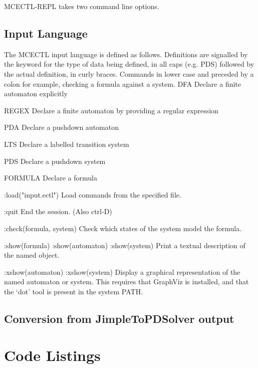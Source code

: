 \documentclass[11pt]{article}
\theoremstyle{definition}
\begin{document}
MCECTL-REPL takes two command line options.



\subsection{Input Language}

The MCECTL input language is defined as follows.
Definitions are signalled by the keyword for the type of data being defined, in all caps (e.g. PDS) followed by the actual definition, in curly braces.
Commands in lower case and preceded by a colon 
for example, checking a formula against a system.
DFA
Declare a finite automaton explicitly

REGEX
Declare a finite automaton by providing a regular expression

PDA
Declare a pushdown automaton

LTS
Declare a labelled transition system

PDS
Declare a pushdown system 

FORMULA
Declare a formula

:load("input.ectl")
Load commands from the specified file.

:quit
End the session. (Also ctrl-D)

:check(formula, system)
Check which states of the system model the formula.

:show(formula)
:show(automaton)
:show(system)
Print a textual description of the named object.

:xshow(automaton)
:xshow(system)
Display a graphical representation of the named automaton or system.
This requires that GraphViz is installed, and that the `dot'
tool is present in the system PATH.

\subsection{Conversion from JimpleToPDSolver output}


\section{Code Listings}
\end{document}
